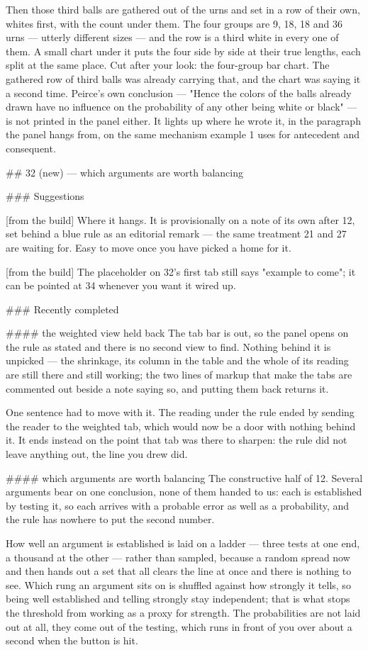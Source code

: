Then those third balls are gathered out of the urns and set in a row of their
own, whites first, with the count under them. The four groups are 9, 18, 18 and
36 urns — utterly different sizes — and the row is a third white in every one of
them. A small chart under it puts the four side by side at their true lengths,
each split at the same place.
Cut after your look: the four-group bar chart. The gathered row of third balls
was already carrying that, and the chart was saying it a second time. Peirce's
own conclusion — "Hence the colors of the balls already drawn have no influence
on the probability of any other being white or black" — is not printed in the
panel either. It lights up where he wrote it, in the paragraph the panel hangs
from, on the same mechanism example 1 uses for antecedent and consequent.


## 32 (new) — which arguments are worth balancing

### Suggestions

[from the build] Where it hangs. It is provisionally on a note of its own after
12, set behind a blue rule as an editorial remark — the same treatment 21 and 27
are waiting for. Easy to move once you have picked a home for it.

[from the build] The placeholder on 32's first tab still says "example to come";
it can be pointed at 34 whenever you want it wired up.

### Recently completed

#### the weighted view held back
The tab bar is out, so the panel opens on the rule as stated and there is no
second view to find. Nothing behind it is unpicked — the shrinkage, its column
in the table and the whole of its reading are still there and still working;
the two lines of markup that make the tabs are commented out beside a note
saying so, and putting them back returns it.

One sentence had to move with it. The reading under the rule ended by sending
the reader to the weighted tab, which would now be a door with nothing behind
it. It ends instead on the point that tab was there to sharpen: the rule did not
leave anything out, the line you drew did.

#### which arguments are worth balancing
The constructive half of 12. Several arguments bear on one conclusion, none of
them handed to us: each is established by testing it, so each arrives with a
probable error as well as a probability, and the rule has nowhere to put the
second number.

How well an argument is established is laid on a ladder — three tests at one
end, a thousand at the other — rather than sampled, because a random spread now
and then hands out a set that all clears the line at once and there is nothing
to see. Which rung an argument sits on is shuffled against how strongly it
tells, so being well established and telling strongly stay independent; that is
what stops the threshold from working as a proxy for strength. The probabilities
are not laid out at all, they come out of the testing, which runs in front of
you over about a second when the button is hit.

